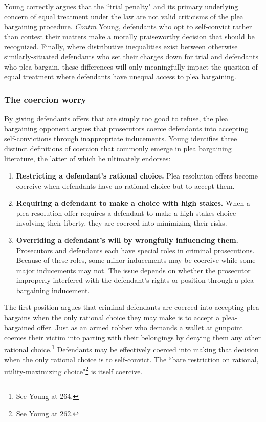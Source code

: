 Young correctly argues that the ``trial penalty" and its primary underlying concern of equal treatment under the law are not valid criticisms of the plea bargaining procedure. \textit{Contra} Young, defendants who opt to self-convict rather than contest their matters make a morally praiseworthy decision that should be recognized. Finally, where distributive inequalities exist between otherwise similarly-situated defendants who set their charges down for trial and defendants who plea bargain, these differences will only meaningfully impact the question of equal treatment where defendants have unequal access to plea bargaining. 

\subsubsection{The coercion worry}

By giving defendants offers that are simply too good to refuse, the plea bargaining opponent argues that prosecutors coerce defendants into accepting self-convictions through inappropriate inducements. Young identifies three distinct definitions of coercion that commonly emerge in plea bargaining literature, the latter of which he ultimately endorses:

\begin{enumerate}
    \item \textbf{Restricting a defendant's rational choice.} Plea resolution offers become coercive when defendants have no rational choice but to accept them.
    \item \textbf{Requiring a defendant to make a choice with high stakes.} When a plea resolution offer requires a defendant to make a high-stakes choice involving their liberty, they are coerced into minimizing their risks.
    \item \textbf{Overriding a defendant's will by wrongfully influencing them.} Prosecutors and defendants each have special roles in criminal prosecutions. Because of these roles, some minor inducements may be coercive while some major inducements may not. The issue depends on whether the prosecutor improperly interfered with the defendant's rights or position through a plea bargaining inducement.
\end{enumerate}

The first position argues that criminal defendants are coerced into accepting plea bargains when the only rational choice they may make is to accept a plea-bargained offer. Just as an armed robber who demands a wallet at gunpoint coerces their victim into parting with their belongings by denying them any other rational choice.\footnote{See Young at 264.} Defendants may be effectively coerced into making that decision when the only rational choice is to self-convict. The ``bare restriction on rational, utility-maximizing choice"\footnote{See Young at 262.} is itself coercive. 

